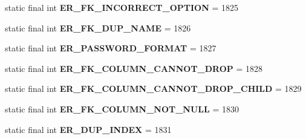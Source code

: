 \begin{DoxyCompactItemize}
\item 
\mbox{\label{classcom_1_1mysql_1_1cj_1_1exceptions_1_1_mysql_error_numbers_acaac42871194ad519a30e0e455d61bbb}} 
static final int {\bfseries E\+R\+\_\+\+F\+K\+\_\+\+I\+N\+C\+O\+R\+R\+E\+C\+T\+\_\+\+O\+P\+T\+I\+ON} = 1825
\item 
\mbox{\label{classcom_1_1mysql_1_1cj_1_1exceptions_1_1_mysql_error_numbers_aedec2822449257c9c4f7c41ba72e1739}} 
static final int {\bfseries E\+R\+\_\+\+F\+K\+\_\+\+D\+U\+P\+\_\+\+N\+A\+ME} = 1826
\item 
\mbox{\label{classcom_1_1mysql_1_1cj_1_1exceptions_1_1_mysql_error_numbers_afd9f6cee1b676a3ab06f754e8ae24de1}} 
static final int {\bfseries E\+R\+\_\+\+P\+A\+S\+S\+W\+O\+R\+D\+\_\+\+F\+O\+R\+M\+AT} = 1827
\item 
\mbox{\label{classcom_1_1mysql_1_1cj_1_1exceptions_1_1_mysql_error_numbers_ac16a3e5e126ea204d5a19630a935b021}} 
static final int {\bfseries E\+R\+\_\+\+F\+K\+\_\+\+C\+O\+L\+U\+M\+N\+\_\+\+C\+A\+N\+N\+O\+T\+\_\+\+D\+R\+OP} = 1828
\item 
\mbox{\label{classcom_1_1mysql_1_1cj_1_1exceptions_1_1_mysql_error_numbers_a733664526942532796903846f55167c8}} 
static final int {\bfseries E\+R\+\_\+\+F\+K\+\_\+\+C\+O\+L\+U\+M\+N\+\_\+\+C\+A\+N\+N\+O\+T\+\_\+\+D\+R\+O\+P\+\_\+\+C\+H\+I\+LD} = 1829
\item 
\mbox{\label{classcom_1_1mysql_1_1cj_1_1exceptions_1_1_mysql_error_numbers_ae61d069c06b067da46cb115cc91effd3}} 
static final int {\bfseries E\+R\+\_\+\+F\+K\+\_\+\+C\+O\+L\+U\+M\+N\+\_\+\+N\+O\+T\+\_\+\+N\+U\+LL} = 1830
\item 
\mbox{\label{classcom_1_1mysql_1_1cj_1_1exceptions_1_1_mysql_error_numbers_a009af513b02eb7ed47ae9e3eea70403a}} 
static final int {\bfseries E\+R\+\_\+\+D\+U\+P\+\_\+\+I\+N\+D\+EX} = 1831
\item 

\end{DoxyCompactItemize}
